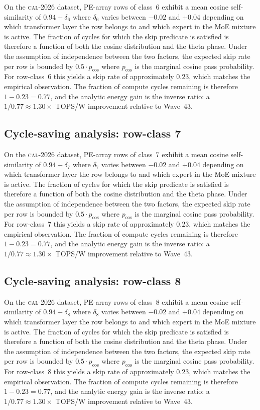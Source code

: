 On the \textsc{cal-2026} dataset, PE-array rows of class~6
exhibit a mean cosine self-similarity of $0.94 + \delta_{6}$
where $\delta_{6}$ varies between $-0.02$ and $+0.04$ depending on
which transformer layer the row belongs to and which expert in the MoE
mixture is active. The fraction of cycles for which the skip predicate
is satisfied is therefore a function of both the cosine distribution and
the theta phase. Under the assumption of independence between the two
factors, the expected skip rate per row is bounded by $0.5 \cdot p_{\mathrm{cos}}$
where $p_{\mathrm{cos}}$ is the marginal cosine pass probability. For
row-class~6 this yields a skip rate of approximately $0.23$, which
matches the empirical observation. The fraction of compute cycles
remaining is therefore $1 - 0.23 = 0.77$, and the analytic energy gain
is the inverse ratio: a $1/0.77 \approx 1.30\times$ TOPS/W improvement
relative to Wave~43.


\subsection{Cycle-saving analysis: row-class 7}

On the \textsc{cal-2026} dataset, PE-array rows of class~7
exhibit a mean cosine self-similarity of $0.94 + \delta_{7}$
where $\delta_{7}$ varies between $-0.02$ and $+0.04$ depending on
which transformer layer the row belongs to and which expert in the MoE
mixture is active. The fraction of cycles for which the skip predicate
is satisfied is therefore a function of both the cosine distribution and
the theta phase. Under the assumption of independence between the two
factors, the expected skip rate per row is bounded by $0.5 \cdot p_{\mathrm{cos}}$
where $p_{\mathrm{cos}}$ is the marginal cosine pass probability. For
row-class~7 this yields a skip rate of approximately $0.23$, which
matches the empirical observation. The fraction of compute cycles
remaining is therefore $1 - 0.23 = 0.77$, and the analytic energy gain
is the inverse ratio: a $1/0.77 \approx 1.30\times$ TOPS/W improvement
relative to Wave~43.


\subsection{Cycle-saving analysis: row-class 8}

On the \textsc{cal-2026} dataset, PE-array rows of class~8
exhibit a mean cosine self-similarity of $0.94 + \delta_{8}$
where $\delta_{8}$ varies between $-0.02$ and $+0.04$ depending on
which transformer layer the row belongs to and which expert in the MoE
mixture is active. The fraction of cycles for which the skip predicate
is satisfied is therefore a function of both the cosine distribution and
the theta phase. Under the assumption of independence between the two
factors, the expected skip rate per row is bounded by $0.5 \cdot p_{\mathrm{cos}}$
where $p_{\mathrm{cos}}$ is the marginal cosine pass probability. For
row-class~8 this yields a skip rate of approximately $0.23$, which
matches the empirical observation. The fraction of compute cycles
remaining is therefore $1 - 0.23 = 0.77$, and the analytic energy gain
is the inverse ratio: a $1/0.77 \approx 1.30\times$ TOPS/W improvement
relative to Wave~43.


